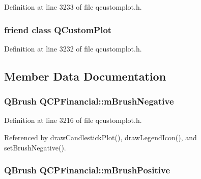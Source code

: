 Definition at line 3233 of file qcustomplot.\+h.

\hypertarget{class_q_c_p_financial_a1cdf9df76adcfae45261690aa0ca2198}{}
\subsubsection[{Q\+Custom\+Plot}]{\setlength{\rightskip}{0pt plus 5cm}friend class {\bf Q\+Custom\+Plot}\hspace{0.3cm}{\ttfamily [friend]}}\label{class_q_c_p_financial_a1cdf9df76adcfae45261690aa0ca2198}


Definition at line 3232 of file qcustomplot.\+h.



\subsection{Member Data Documentation}
\hypertarget{class_q_c_p_financial_acb0e31874b7a1deb56bd42e8ab3e68f2}{}
\subsubsection[{m\+Brush\+Negative}]{\setlength{\rightskip}{0pt plus 5cm}Q\+Brush Q\+C\+P\+Financial\+::m\+Brush\+Negative\hspace{0.3cm}{\ttfamily [protected]}}\label{class_q_c_p_financial_acb0e31874b7a1deb56bd42e8ab3e68f2}


Definition at line 3216 of file qcustomplot.\+h.



Referenced by draw\+Candlestick\+Plot(), draw\+Legend\+Icon(), and set\+Brush\+Negative().

\hypertarget{class_q_c_p_financial_ab7e6eed16260a2f88ca6bd940dffea79}{}
\subsubsection[{m\+Brush\+Positive}]{\setlength{\rightskip}{0pt plus 5cm}Q\+Brush Q\+C\+P\+Financial\+::m\+Brush\+Positive\hspace{0.3cm}{\ttfamily [protected]}}\label{class_q_c_p_financial_ab7e6eed16260a2f88ca6bd940dffea79}


